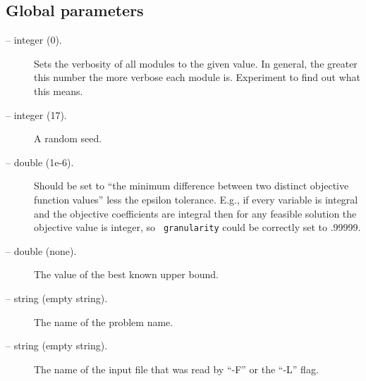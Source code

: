 \subsection{Global parameters}
\begin{description}
\item[ -- integer (0).] 
Sets the verbosity of all modules to the given value. In general,
the greater this number the more verbose each module is. Experiment
to find out what this means.

\item[ -- integer (17).] 
A random seed.

\item[ -- double (1e-6).]
Should be set to ``the minimum difference between two distinct
objective function values'' less the epsilon tolerance. E.g., if every
variable is integral and the objective coefficients are integral then
for any feasible solution the objective value is integer, so {\tt
granularity} could be correctly set to .99999.

\item[ -- double (none).] 
The value of the best known upper bound.

\item[ -- string (empty string).]
The name of the problem name.

\item[ -- string (empty string).]
The name of the input file that was read by ``-F'' or the ``-L'' flag.

\end{description}

